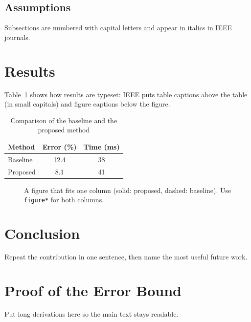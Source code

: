 \documentclass[journal]{IEEEtran}
\begin{document}
\subsection{Assumptions}
Subsections are numbered with capital letters and appear in italics in IEEE journals.

\section{Results}\label{sec:results}
Table~\ref{tab:results} shows how results are typeset: IEEE puts table captions above
the table (in small capitals) and figure captions below the figure.

\begin{table}[!t]
  \caption{Comparison of the baseline and the proposed method}
  \label{tab:results}
  \centering
  \begin{tabular}{lcc}
    \toprule
    Method & Error (\%) & Time (ms) \\
    \midrule
    Baseline & 12.4 & 38 \\
    Proposed & 8.1 & 41 \\
    \bottomrule
  \end{tabular}
\end{table}

\begin{figure}[!t]
  \centering
  \caption{A figure that fits one column (solid: proposed, dashed: baseline). Use
  \texttt{figure*} for both columns.}
  \label{fig:error}
\end{figure}

\section{Conclusion}
Repeat the contribution in one sentence, then name the most useful future work.

\appendices
\section{Proof of the Error Bound}\label{app:proof}
Put long derivations here so the main text stays readable.
\end{document}
